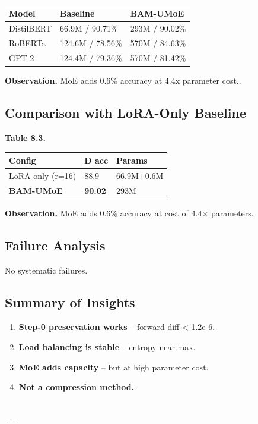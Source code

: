 \begin{table}[H]
\centering
\small
\begin{tabular}{lll}
\toprule
\textbf{Model} & \textbf{Baseline} & \textbf{BAM-UMoE} \\
\midrule
DistilBERT & 66.9M / 90.71\% & 293M / 90.02\% \\
RoBERTa & 124.6M / 78.56\% & 570M / 84.63\% \\
GPT-2 & 124.4M / 79.36\% & 570M / 81.42\% \\
\bottomrule
\end{tabular}
\end{table}

\textbf{Observation.} MoE adds 0.6\% accuracy at 4.4x parameter cost..

\subsection{Comparison with LoRA-Only Baseline}

\textbf{Table 8.3.}

\begin{table}[H]
\centering
\small
\begin{tabular}{lll}
\toprule
\textbf{Config} & \textbf{D acc} & \textbf{Params} \\
\midrule
LoRA only (r=16) & 88.9 & 66.9M+0.6M \\
\textbf{BAM-UMoE} & \textbf{90.02} & 293M \\
\bottomrule
\end{tabular}
\end{table}

\textbf{Observation.} MoE adds 0.6\% accuracy at cost of 
4.4$\times$ parameters.

\subsection{Failure Analysis}

No systematic failures.

\subsection{Summary of Insights}

\begin{enumerate}
\item \textbf{Step-0 preservation works} -- forward diff \textless{} 1.2e-6.
\item \textbf{Load balancing is stable} -- entropy near max.
\item \textbf{MoE adds capacity} -- but at high parameter cost.
\item \textbf{Not a compression method.}
\end{enumerate}
\begin{lstlisting}

---
\end{lstlisting}

